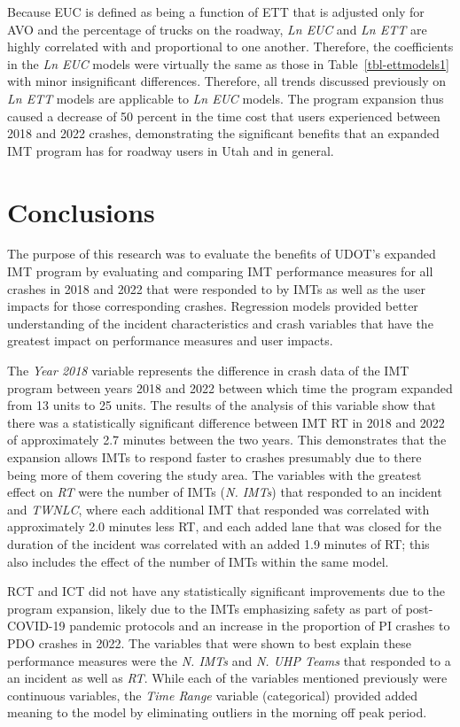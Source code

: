 \documentclass[
  letterpaper,
  authoryear]{elsarticle}
\begin{document}
Because EUC is defined as being a function of ETT that is adjusted only
for AVO and the percentage of trucks on the roadway, \emph{Ln EUC} and
\emph{Ln ETT} are highly correlated with and proportional to one
another. Therefore, the coefficients in the \emph{Ln EUC} models were
virtually the same as those in Table~\ref{tbl-ettmodels1} with minor
insignificant differences. Therefore, all trends discussed previously on
\emph{Ln ETT} models are applicable to \emph{Ln EUC} models. The program
expansion thus caused a decrease of 50 percent in the time cost that
users experienced between 2018 and 2022 crashes, demonstrating the
significant benefits that an expanded IMT program has for roadway users
in Utah and in general.


\section{Conclusions}\label{conclusions}

The purpose of this research was to evaluate the benefits of UDOT's
expanded IMT program by evaluating and comparing IMT performance
measures for all crashes in 2018 and 2022 that were responded to by IMTs
as well as the user impacts for those corresponding crashes. Regression
models provided better understanding of the incident characteristics and
crash variables that have the greatest impact on performance measures
and user impacts.

The \emph{Year 2018} variable represents the difference in crash data of
the IMT program between years 2018 and 2022 between which time the
program expanded from 13 units to 25 units. The results of the analysis
of this variable show that there was a statistically significant
difference between IMT RT in 2018 and 2022 of approximately 2.7 minutes
between the two years. This demonstrates that the expansion allows IMTs
to respond faster to crashes presumably due to there being more of them
covering the study area. The variables with the greatest effect on
\emph{RT} were the number of IMTs (\emph{N. IMTs}) that responded to an
incident and \emph{TWNLC}, where each additional IMT that responded was
correlated with approximately 2.0 minutes less RT, and each added lane
that was closed for the duration of the incident was correlated with an
added 1.9 minutes of RT; this also includes the effect of the number of
IMTs within the same model.

RCT and ICT did not have any statistically significant improvements due
to the program expansion, likely due to the IMTs emphasizing safety as
part of post-COVID-19 pandemic protocols and an increase in the
proportion of PI crashes to PDO crashes in 2022. The variables that were
shown to best explain these performance measures were the \emph{N. IMTs}
and \emph{N. UHP Teams} that responded to a an incident as well as
\emph{RT}. While each of the variables mentioned previously were
continuous variables, the \emph{Time Range} variable (categorical)
provided added meaning to the model by eliminating outliers in the
morning off peak period.
\end{document}
